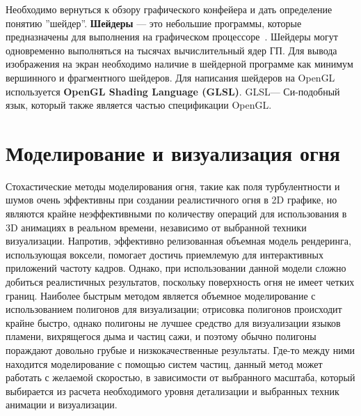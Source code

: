Необходимо вернуться к обзору графического конфейера и дать определение понятию
''шейдер''. \textbf{Шейдеры} --- это небольшие программы, которые предназначены
для выполнения на графическом процессоре~\cite{LearnOGL}. Шейдеры могут
одновременно выполняться на тысячах вычислительный ядер ГП. Для вывода
изображения на экран необходимо наличие в шейдерной программе как минимум
вершинного и фрагментного шейдеров. Для написания шейдеров на OpenGL
используется \textbf{OpenGL Shading Language (GLSL)}. GLSL\@--- Си-подобный язык,
который также является частью спецификации OpenGL\@.

\section{Моделирование и визуализация огня}

Стохастические методы моделирования огня, такие как поля турбулентности и шумов
очень эффективны при создании реалистичного огня в 2D графике, но являются
крайне неэффективными по количеству операций для использования в 3D анимациях в
реальном времени, независимо от выбранной техники визуализации. Напротив,
эффективно релизованная объемная модель рендеринга, использующая воксели,
помогает достичь приемлемую для интерактивных приложений частоту кадров. Однако,
при использовании данной модели сложно добиться реалистичных результатов,
поскольку поверхность огня не имеет четких границ. Наиболее быстрым методом
является объемное моделирование с использованием полигонов для визуализации;
отрисовка полигонов происходит крайне быстро, однако полигоны не лучшее средство
для визуализации языков пламени, вихрящегося дыма и частиц сажи, и поэтому
обычно полигоны пораждают довольно грубые и низкокачественные результаты. Где-то
между ними находится моделирование с помощью систем частиц, данный метод может
работать с желаемой скоростью, в зависимости от выбранного масштаба, который
выбирается из расчета необходимого уровня детализации и выбранных техник
анимации и визуализации.

